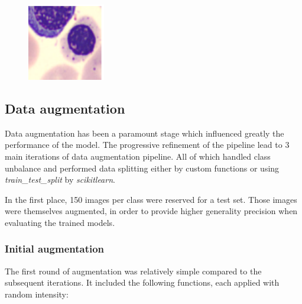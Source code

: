 \documentclass[11pt]{article}
\begin{document}
\begin{figure}[H]
\begin{minipage}{0.2\textwidth}
        \includegraphics[width=\linewidth]{images/ambiguous2.png}
    \end{minipage}
\end{figure}

\subsection{Data augmentation}

Data augmentation has been a paramount stage which influenced greatly the performance of the model.
The progressive refinement of the pipeline lead to 3 main iterations of data augmentation pipeline.
All of which handled class unbalance and performed data splitting either by custom functions or using \textit{train\_test\_split} by \textit{scikit\-learn}.

In the first place, 150 images per class were reserved for a test set.
Those images were themselves augmented, in order to provide higher generality precision when evaluating the trained models.

\subsubsection{Initial augmentation}

The first round of augmentation was relatively simple compared to the subsequent iterations.
It included the following functions, each applied with random intensity:
\end{document}
